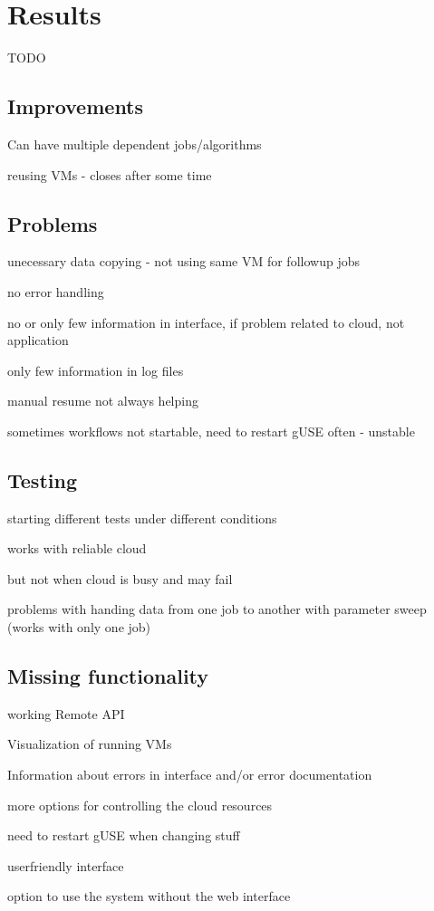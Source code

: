 \section{Results}\label{results}

TODO

\subsection{Improvements}\label{improvements}

Can have multiple dependent jobs/algorithms

reusing VMs - closes after some time

\subsection{Problems}\label{problems}

unecessary data copying - not using same VM for followup jobs

no error handling

no or only few information in interface, if problem related to cloud, not application

only few information in log files

manual resume not always helping

sometimes workflows not startable, need to restart gUSE often - unstable

\subsection{Testing}\label{testing}

starting different tests under different conditions

works with reliable cloud

but not when cloud is busy and may fail

problems with handing data from one job to another with parameter sweep (works with only one job)

\subsection{Missing functionality}\label{missing}

working Remote API

Visualization of running VMs

Information about errors in interface and/or error documentation

more options for controlling the cloud resources

need to restart gUSE when changing stuff

userfriendly interface

option to use the system without the web interface